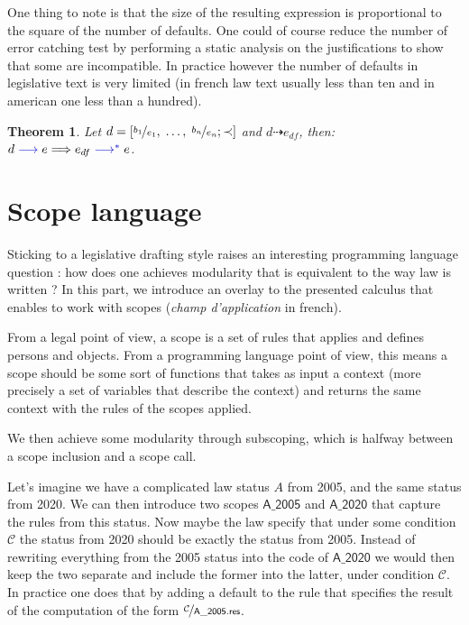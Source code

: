 \documentclass[11pt,a4paper]{article}
\newtheorem{theorem}{Theorem}
\newcommand{\synvar}[1]{\ensuremath{#1}}
\newcommand{\syndefault}[3]{\left[\nicefrac{\synvar{#1_1}}{\synvar{#2_1}},\;\ldots,\;\nicefrac{\synvar{#1_#3}}{\synvar{#2_#3}};\prec\right]}
\newcommand{\exctx}[1]{\textcolor{blue!80!black}{\ensuremath{#1}}}
\newcommand{\exeval}{\exctx{\;\longrightarrow\;}}
\newcommand{\exevalstar}{\exctx{\;\longrightarrow^*\;}}
\newcommand{\excomp}{\dashrightarrow}
\begin{document}
One thing to note is that the size of the resulting expression is proportional to the square of the number of defaults. One could of course reduce the number of error catching test by performing a static analysis on the justifications to show that some are incompatible. In practice however the number of defaults in legislative text is very limited (in french law text usually less than ten and in american one less than a hundred).

\begin{theorem}
  Let $d = \syndefault{b}{e}{n}$ and $d\excomp e_{df}$, then: $d \exeval e \Longrightarrow e_{df} \exevalstar e$.
\end{theorem}

\section{Scope language}

Sticking to a legislative drafting style raises an interesting programming language question : how does one achieves modularity that is equivalent to the way law is written ? In this part, we introduce an overlay to the presented calculus that enables to work with scopes (\textit{champ d'application} in french).

From a legal point of view, a scope is a set of rules that applies and defines persons and objects. From a programming language point of view, this means a scope should be some sort of functions that takes as input a context (more precisely a set of variables that describe the context) and returns the same context with the rules of the scopes applied.

We then achieve some modularity through subscoping, which is halfway between a scope inclusion and a scope call. 

Let's imagine we have a complicated law status $A$ from 2005, and the same status from 2020. We can then introduce two scopes $\mathsf{A\_2005}$ and $\mathsf{A\_2020}$ that capture the rules from this status. Now maybe the law specify that under some condition $\mathcal{C}$ the status from 2020 should be exactly the status from 2005. Instead of rewriting everything from the 2005 status into the code of $\mathsf{A\_2020}$ we would then keep the two separate and include the former into the latter, under condition $\mathcal{C}$. In practice one does that by adding a default to the rule that specifies the result of the computation of the form $\nicefrac{\mathcal{C}}{\mathsf{A\_2005.res}}$.
\end{document}
